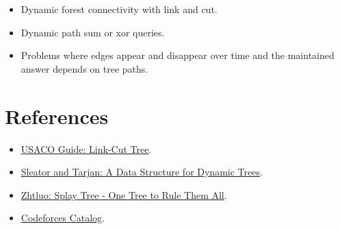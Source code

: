 \begin{itemize}
  \item Dynamic forest connectivity with link and cut.
  \item Dynamic path sum or xor queries.
  \item Problems where edges appear and disappear over time and the maintained answer depends on tree paths.
\end{itemize}

\section*{References}

\begin{itemize}
  \item \href{https://usaco.guide/adv/link-cut-tree?lang=cpp}{USACO Guide: Link-Cut Tree}.
  \item \href{https://www.researchgate.net/publication/221590599_A_Data_Structure_for_Dynamic_Trees}{Sleator and Tarjan: A Data Structure for Dynamic Trees}.
  \item \href{https://zhtluo.com/cp/splay-tree-one-tree-to-rule-them-all.html}{Zhtluo: Splay Tree - One Tree to Rule Them All}.
  \item \href{https://codeforces.com/catalog}{Codeforces Catalog}.
\end{itemize}
